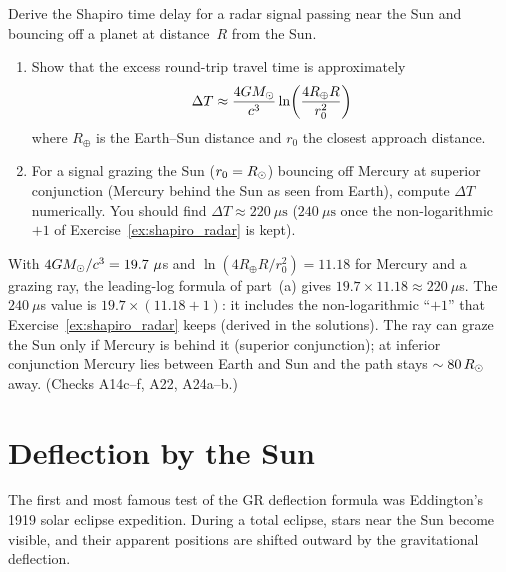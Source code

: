 \begin{exercise}
\label{ex:shapiro_sun}
Derive the Shapiro time delay for a radar signal passing near the Sun and
bouncing off a planet at distance~$R$ from the Sun.
\begin{enumerate}[label=(\alph*)]
    \item Show that the excess round-trip travel time is approximately
          \begin{equation*}
              \Delta T \approx \frac{4G M_{\odot}}{c^3}
              \ln\!\left(\frac{4 R_\oplus R}{r_0^2}\right)
          \end{equation*}
          where $R_\oplus$ is the Earth--Sun distance and $r_0$ the
          closest approach distance.
    \item For a signal grazing the Sun ($r_0 = R_{\odot}$) bouncing off
          Mercury at superior conjunction (Mercury behind the Sun as seen
          from Earth), compute $\Delta T$ numerically.
          You should find $\Delta T \approx 220~\mu\mathrm{s}$
          ($240~\mu\mathrm{s}$ once the non-logarithmic $+1$ of
          Exercise~\ref{ex:shapiro_radar} is kept).
\end{enumerate}
\end{exercise}


\begin{annotation}[220 versus 240\,$\mu$s]
With $4GM_{\odot}/c^3 = 19.7~\mu$s and
$\ln(4R_\oplus R/r_0^2) = 11.18$ for Mercury and a grazing ray, the leading-log
formula of part~(a) gives $19.7 \times 11.18 \approx 220~\mu$s.  The
$240~\mu$s value is $19.7 \times (11.18 + 1)$: it includes the non-logarithmic
``$+1$'' that Exercise~\ref{ex:shapiro_radar} keeps (derived in the solutions).
The ray can graze the Sun only if Mercury is behind it (superior conjunction);
at inferior conjunction Mercury lies between Earth and Sun and the path stays
$\sim 80\,R_{\odot}$ away.  (Checks A14c--f, A22, A24a--b.)
\end{annotation}

\section{Deflection by the Sun}
\label{sec:deflection_sun}

The first and most famous test of the GR deflection formula was
Eddington's 1919 solar eclipse expedition.  During a total
eclipse, stars near the Sun become visible, and their apparent positions
are shifted outward by the gravitational deflection.

